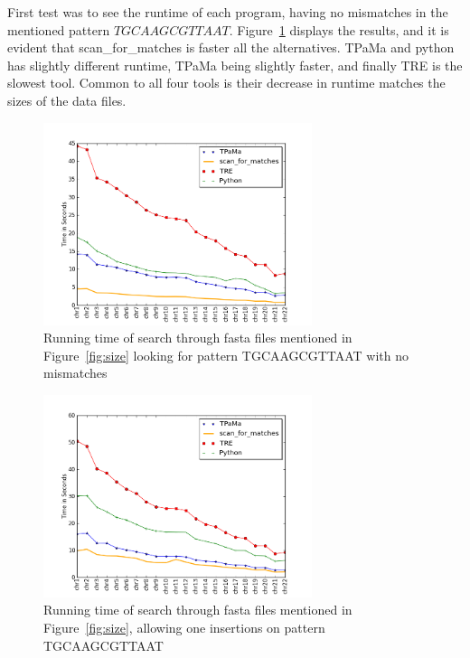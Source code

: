 \newpage

First test was to see the runtime of each program, having no mismatches in the mentioned pattern $TGCAAGCGTTAAT$. Figure~\ref{fig:0miss} displays the results, and it is evident that scan\_for\_matches is faster all the alternatives. TPaMa and python has slightly different runtime, TPaMa being slightly faster, and finally TRE is the slowest tool. Common to all four tools is their decrease in runtime matches the sizes of the data files.

\begin{figure}[h!]
\centering
\includegraphics[width=0.7\textwidth]{Benchmarking/0miss.png}
\caption{Running time of search through fasta files mentioned in Figure~\ref{fig:size} looking for pattern TGCAAGCGTTAAT with no mismatches}
\label{fig:0miss}
\end{figure}


\begin{figure}[h!]
\centering
\includegraphics[width=0.7\textwidth]{Benchmarking/1ins.png}
\caption{Running time of search through fasta files mentioned in Figure~\ref{fig:size},  allowing one insertions on pattern TGCAAGCGTTAAT}
\label{fig:ins1}
\end{figure}



